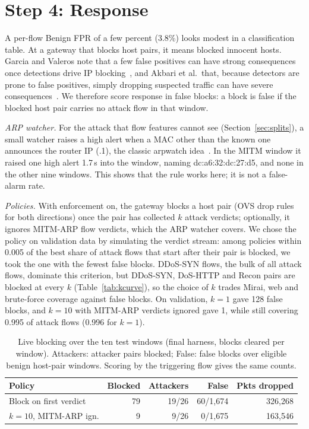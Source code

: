 \section{Step 4: Response}\label{sec:response}

A per-flow Benign FPR of a few percent (3.8\%) looks modest in a classification table. At a gateway that blocks host pairs, it means blocked innocent hosts. Garcia and Valeros note that a few false positives can have strong consequences once detections drive IP blocking~\cite{garcia2023labeling}, and Akbari et al.\ that, because detectors are prone to false positives, simply dropping suspected traffic can have severe consequences~\cite{akbari2020atmos}. We therefore score response in false blocks: a block is false if the blocked host pair carries no attack flow in that window.

\emph{ARP watcher.} For the attack that flow features cannot see (Section~\ref{sec:splits}), a small watcher raises a high alert when a MAC other than the known one announces the router IP (.1), the classic arpwatch idea~\cite{arpwatch}. In the MITM window it raised one high alert 1.7\,s into the window, naming dc:a6:32:dc:27:d5, and none in the other nine windows. This shows that the rule works here; it is not a false-alarm rate.

\emph{Policies.} With enforcement on, the gateway blocks a host pair (OVS drop rules for both directions) once the pair has collected $k$ attack verdicts; optionally, it ignores MITM-ARP flow verdicts, which the ARP watcher covers. We chose the policy on validation data by simulating the verdict stream: among policies within 0.005 of the best share of attack flows that start after their pair is blocked, we took the one with the fewest false blocks. DDoS-SYN flows, the bulk of all attack flows, dominate this criterion, but DDoS-SYN, DoS-HTTP and Recon pairs are blocked at every $k$ (Table~\ref{tab:kcurve}), so the choice of $k$ trades Mirai, web and brute-force coverage against false blocks. On validation, $k=1$ gave 128 false blocks, and $k=10$ with MITM-ARP verdicts ignored gave 1, while still covering 0.995 of attack flows (0.996 for $k=1$).

\begin{table}[t]
\centering
\caption{Live blocking over the ten test windows (final harness, blocks cleared per window). Attackers: attacker pairs blocked; False: false blocks over eligible benign host-pair windows. Scoring by the triggering flow gives the same counts.}
\label{tab:blocking}
\footnotesize
\setlength{\tabcolsep}{3pt}
\begin{tabular}{lrrrr}
\hline
Policy & Blocked & Attackers & False & Pkts dropped \\
\hline
Block on first verdict & 79 & 19/26 & 60/1,674 & 326,268 \\
$k=10$, MITM-ARP ign. & 9 & 9/26 & 0/1,675 & 163,546 \\
\hline
\end{tabular}
\end{table}


